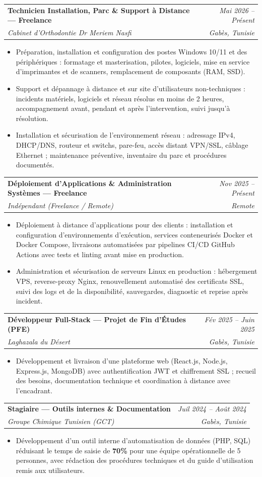 \documentclass[letterpaper,9pt]{article}
\makeatletter
\newcommand{\resumeItem}[1]{\item\small{#1}}
\newcommand{\resumeSubheading}[4]{
  \vspace{-1pt}\item
  \begin{tabular*}{0.97\textwidth}[t]{l@{\extracolsep{\fill}}r}
    \textbf{#1} & \textit{\color{greytext}#2} \\
    \textit{\small\color{greytext} #3} & \textit{\small\color{greytext} #4}
  \end{tabular*}\vspace{-2pt}
}
\newcommand{\resumeItemListStart}{\begin{itemize}[leftmargin=0.24in, label={}, itemsep=0.9pt, topsep=1.2pt, parsep=0pt]}
\newcommand{\resumeItemListEnd}{\end{itemize}\vspace{-2pt}}
\makeatother
\begin{document}
  \resumeSubheading{Technicien Installation, Parc \& Support à Distance --- Freelance}{Mai 2026 -- Présent}{Cabinet d'Orthodontie Dr Meriem Nasfi}{Gabès, Tunisie}
    \resumeItemListStart
      \resumeItem{Préparation, installation et configuration des postes Windows 10/11 et des périphériques : formatage et masterisation, pilotes, logiciels, mise en service d'imprimantes et de scanners, remplacement de composants (RAM, SSD).}
      \resumeItem{Support et dépannage à distance et sur site d'utilisateurs non-techniques : incidents matériels, logiciels et réseau résolus en moins de 2 heures, accompagnement avant, pendant et après l'intervention, suivi jusqu'à résolution.}
      \resumeItem{Installation et sécurisation de l'environnement réseau : adressage IPv4, DHCP/DNS, routeur et switchs, pare-feu, accès distant VPN/SSL, câblage Ethernet ; maintenance préventive, inventaire du parc et procédures documentés.}
    \resumeItemListEnd

  \resumeSubheading{Déploiement d'Applications \& Administration Systèmes --- Freelance}{Nov 2025 -- Présent}{Indépendant (Freelance / Remote)}{Remote}
    \resumeItemListStart
      \resumeItem{Déploiement à distance d'applications pour des clients : installation et configuration d'environnements d'exécution, services conteneurisés Docker et Docker Compose, livraisons automatisées par pipelines CI/CD GitHub Actions avec tests et linting avant mise en production.}
      \resumeItem{Administration et sécurisation de serveurs Linux en production : hébergement VPS, reverse-proxy Nginx, renouvellement automatisé des certificats SSL, suivi des logs et de la disponibilité, sauvegardes, diagnostic et reprise après incident.}
    \resumeItemListEnd

  \resumeSubheading{Développeur Full-Stack --- Projet de Fin d'Études (PFE)}{Fév 2025 -- Juin 2025}{Laghazala du Désert}{Gabès, Tunisie}
    \resumeItemListStart
      \resumeItem{Développement et livraison d'une plateforme web (React.js, Node.js, Express.js, MongoDB) avec authentification JWT et chif\hspace{0pt}frement SSL ; recueil des besoins, documentation technique et coordination à distance avec l'encadrant.}
    \resumeItemListEnd

  \resumeSubheading{Stagiaire --- Outils internes \& Documentation}{Juil 2024 -- Août 2024}{Groupe Chimique Tunisien (GCT)}{Gabès, Tunisie}
    \resumeItemListStart
      \resumeItem{Développement d'un outil interne d'automatisation de données (PHP, SQL) réduisant le temps de saisie de \textbf{70\%} pour une équipe opérationnelle de 5 personnes, avec rédaction des procédures techniques et du guide d'utilisation remis aux utilisateurs.}
    \resumeItemListEnd
\end{document}
